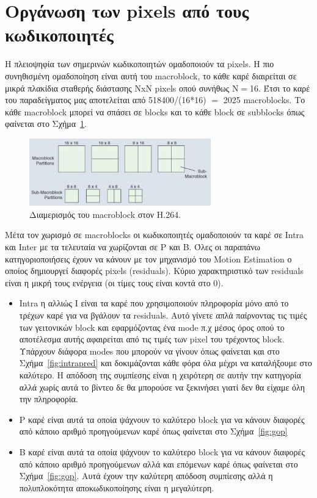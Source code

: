 \newpage
\section{Οργάνωση των pixels από τους κωδικοποιητές}
\label{section:sect23}

\indent Η πλειοψηφία των σημερινών κωδικοποιητών ομαδοποιούν τα pixels. Η πιο συνηθισμένη ομαδοποίηση είναι αυτή του macroblock, το κάθε καρέ διαιρείται σε μικρά πλακίδια σταθερής διάστασης NxN pixels οπού συνήθως N$=$16. Έτσι το καρέ του παραδείγματος μας αποτελείται από 518400/(16*16) $=$ 2025 macroblocks. Το κάθε macroblock μπορεί να σπάσει σε blocks και το κάθε block σε subblocks όπως φαίνεται στο Σχήμα~\ref{fig:mbpart}.

\begin{figure}[H]
  \centering
    \includegraphics[width=0.7\textwidth]{chapter2/mbpart.jpg}
  \caption{Διαμερισμός του macroblock στον H.264.\cite{misc:mbpart}}
  \label{fig:mbpart}
\end{figure}

\indent Μέτα τον χωρισμό σε macroblocks οι κωδικοποιητές ομαδοποιούν τα καρέ σε Intra και Inter με τα τελευταία να χωρίζονται σε P και Β. Όλες οι παραπάνω κατηγοριοποιήσεις έχουν να κάνουν με τον μηχανισμό του Motion Estimation ο οποίος δημιουργεί διαφορές pixels (residuals). Κύριο χαρακτηριστικό των residuals είναι η μικρή τους ενέργεια (οι τίμες τους είναι κοντά στο 0).

\begin{itemize}
  \item Intra η αλλιώς I είναι τα καρέ που χρησιμοποιούν πληροφορία μόνο από το τρέχων καρέ για να βγάλουν τα residuals. Αυτό γίνετε απλά παίρνοντας τις τιμές των γειτονικών block και εφαρμόζοντας ένα mode π.χ μέσος όρος οπού το αποτέλεσμα αυτής αφαιρείται από τις τιμές των pixel του τρέχοντος block. Υπάρχουν διάφορα modes που μπορούν να γίνουν όπως φαίνεται και στο Σχήμα~\ref{fig:intrapred} και δοκιμάζονται κάθε φόρα όλα μέχρι να καταλήξουμε στο καλύτερο. Η απόδοση της συμπίεσης είναι η χειρότερη σε αυτήν την κατηγορία αλλά χωρίς αυτά το βίντεο δε θα μπορούσε να ξεκινήσει γιατί δεν θα είχαμε όλη την πληροφορία.

  \item P καρέ είναι αυτά τα οποία ψάχνουν το καλύτερο block για να κάνουν διαφορές από κάποιο αριθμό προηγούμενων καρέ όπως φαίνεται στο Σχήμα~\ref{fig:gop}

  \item Β καρέ είναι αυτά τα οποία ψάχνουν το καλύτερο block για να κάνουν διαφορές από κάποιο αριθμό προηγούμενων αλλά και επόμενων καρέ όπως φαίνεται στο Σχήμα~\ref{fig:gop}. Αυτά έχουν την καλύτερη απόδοση συμπίεσης αλλά η πολυπλοκότητα αποκωδικοποίησης είναι η μεγαλύτερη.
\end{itemize}

